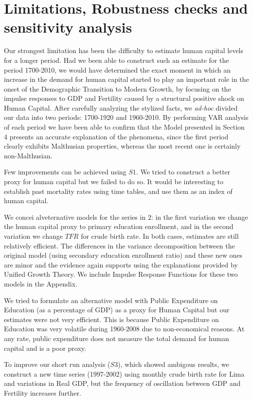 \documentclass[12pt]{article}%
\begin{document}
\section{Limitations, Robustness checks and sensitivity analysis}
Our strongest limitation has been the difficulty to estimate human capital levels for a longer period. Had we been able to construct such an estimate for the period 1700-2010, we would have determined the exact moment in which an increase in the demand for human capital started to play an important role in the onset of the Demographic Transition to Modern Growth, by focusing on the impulse responses to GDP and Fertility caused by a structural positive shock on Human Capital. After carefully analyzing the stylized facts, we \emph{ad-hoc} divided our data into two periods: 1700-1920 and 1960-2010. By performing VAR analysis of each period we have been able to confirm that the Model presented in Section 4 presents an accurate explanation of the phenomena, since the first period clearly exhibits Malthusian properties, whereas the most recent one is certainly non-Malthusian.

Few improvements can be achieved using $S1$. We tried to construct a better proxy for human capital but we failed to do so. It would be interesting to establish past mortality rates using time tables, and use them as an index of human capital.

We concei alveternative models for the series in $2$: in the first variation we change the human capital proxy to primary education enrollment, and in the second variation we change $TFR$ for crude birth rate. In both cases, estimates are still relatively efficient. The differences in the variance decomposition between the original model (using secondary education enrollment ratio) and these new ones are minor and the evidence again supports using the explanations provided by Unified Growth Theory. We include Impulse Response Functions for these two models in the Appendix.

We tried to formulate an alternative model with Public Expenditure on Education (as a percentage of GDP) as a proxy for Human Capital but our estimates were not very efficient. This is because Public Expenditure on Education was very volatile during 1960-2008 due to non-economical reasons. At any rate, public expenditure does not measure the total demand for human capital and is a poor proxy.

To improve our short run analysis ($S3$), which showed ambigous results, we construct a new time series (1997-2002) using monthly crude birth rate for Lima and variations in Real GDP, but the frequency of oscillation between GDP and Fertility increases further.
\end{document}
